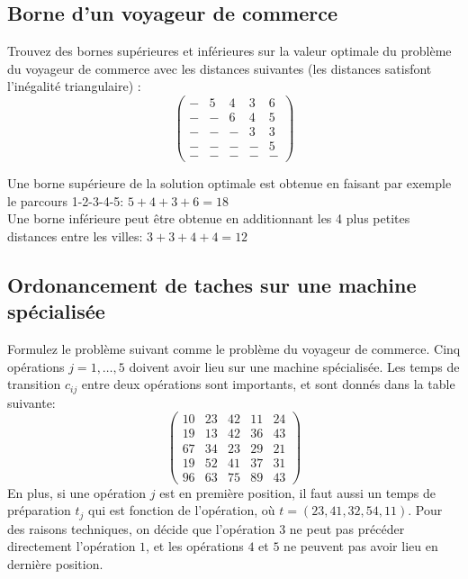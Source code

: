\subsection{Borne d'un voyageur de commerce}
Trouvez des bornes supérieures et inférieures sur la valeur optimale du problème du voyageur de commerce avec les distances suivantes (les distances satisfont l'inégalité triangulaire) :
\begin{equation}
  \left( \begin{matrix}
      - & 5 & 4 & 3 & 6 \\
      - & - & 6 & 4 & 5 \\
      - & - & - & 3 & 3 \\
      - & - & - & - & 5 \\
      - & - & - & - & -
  \end{matrix}  \right)
\end{equation}
\begin{solution}
Une borne supérieure de la solution optimale est obtenue en faisant par exemple le parcours 1-2-3-4-5: $5+4+3+6=18$\\
Une borne inférieure peut être obtenue en additionnant les 4 plus petites distances entre les villes: $3+3+4+4=12$\\
\end{solution}

\subsection{Ordonancement de taches sur une machine spécialisée}
Formulez le problème suivant comme le problème du voyageur de commerce. Cinq opérations $j=1,…,5$ doivent avoir lieu sur une machine spécialisée. Les temps de transition $c_{ij}$ entre deux opérations sont importants, et sont donnés dans la table suivante:
\begin{equation}
  \left( \begin{matrix}
      10 & 23 & 42 & 11 & 24 \\
      19 & 13 & 42 & 36 & 43 \\
      67 & 34 & 23 & 29 & 21 \\
      19 & 52 & 41 & 37 & 31 \\
      96 & 63 & 75 & 89 & 43
  \end{matrix}  \right)
\end{equation}
En plus, si une opération $j$ est en première position, il faut aussi un temps de préparation $t_j$ qui est fonction de l'opération, où $t=(23,41,32,54,11)$. Pour des raisons techniques, on décide que l'opération $3$ ne peut pas précéder directement l'opération $1$, et les opérations $4$ et $5$ ne peuvent pas avoir lieu en dernière position.

